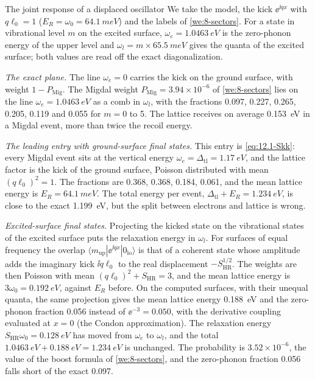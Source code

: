 \begin{workedexample}{The joint response of a displaced oscillator}\label{we:12-oscillator}
We take the model, the kick $\ee^{\ii qx}$ with $q\ell_0 = 1$ ($E_R = \omega_0 = \SI{64.1}{meV}$) and the labels of \cref{we:8-sectors}. For a state in vibrational level $m$ on the excited surface, $\omega_e = \SI{1.0463}{eV}$ is the zero-phonon energy of the upper level and $\omega_l = m \times \SI{65.5}{meV}$ gives the quanta of the excited surface; both values are read off the exact diagonalization.

\emph{The exact plane.} The line $\omega_e = 0$ carries the kick on the ground surface, with weight $1 - P_{\mathrm{Mig}}$. The Migdal weight $P_{\mathrm{Mig}} = 3.94\times10^{-6}$ of \cref{we:8-sectors} lies on the line $\omega_e = \SI{1.0463}{eV}$ as a comb in $\omega_l$, with the fractions 0.097, 0.227, 0.265, 0.205, 0.119 and 0.055 for $m = 0$ to 5. The lattice receives on average \SI{0.153}{eV} in a Migdal event, more than twice the recoil energy.

\emph{The leading entry with ground-surface final states.} This entry is \cref{eq:12.1-Skk}: every Migdal event sits at the vertical energy $\omega_e = \Delta_{\mathrm{tl}} = \SI{1.17}{eV}$, and the lattice factor is the kick of the ground surface, Poisson distributed with mean $(q\ell_0)^2 = 1$. The fractions are 0.368, 0.368, 0.184, 0.061, and the mean lattice energy is $E_R = \SI{64.1}{meV}$. The total energy per event, $\Delta_{\mathrm{tl}} + E_R = \SI{1.234}{eV}$, is close to the exact \SI{1.199}{eV}, but the split between electrons and lattice is wrong.

\emph{Excited-surface final states.} Projecting the kicked state on the vibrational states of the excited surface puts the relaxation energy in $\omega_l$. For surfaces of equal frequency the overlap $\langle m_{\mathrm{up}}|\ee^{\ii qx}|0_{\mathrm{lo}}\rangle$ is that of a coherent state whose amplitude adds the imaginary kick $\ii q\ell_0$ to the real displacement $-S_{\mathrm{HR}}^{1/2}$. The weights are then Poisson with mean $(q\ell_0)^2 + S_{\mathrm{HR}} = 3$, and the mean lattice energy is $3\omega_0 = \SI{0.192}{eV}$, against $E_R$ before. On the computed surfaces, with their unequal quanta, the same projection gives the mean lattice energy \SI{0.188}{eV} and the zero-phonon fraction 0.056 instead of $\ee^{-3} = 0.050$, with the derivative coupling evaluated at $x = 0$ (the Condon approximation). The relaxation energy $S_{\mathrm{HR}}\omega_0 = \SI{0.128}{eV}$ has moved from $\omega_e$ to $\omega_l$, and the total $\SI{1.0463}{eV} + \SI{0.188}{eV} = \SI{1.234}{eV}$ is unchanged. The probability is $3.52\times10^{-6}$, the value of the boost formula of \cref{we:8-sectors}, and the zero-phonon fraction 0.056 falls short of the exact 0.097.


\end{workedexample}
